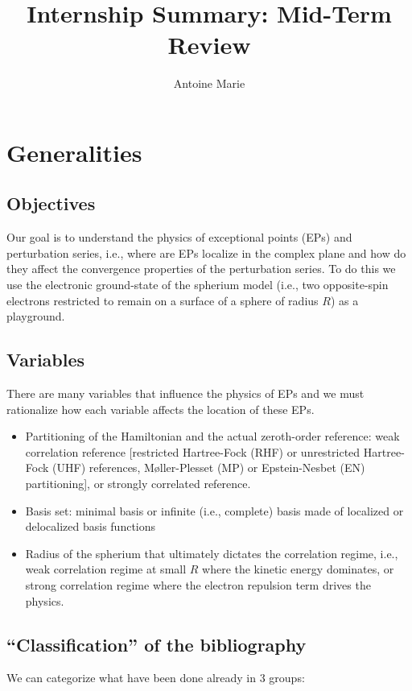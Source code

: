 \documentclass{article}
\title{Internship Summary: Mid-Term Review}
\author{Antoine Marie}
\begin{document}
\maketitle

\section{Generalities}

\subsection{Objectives}
Our goal is to understand the physics of exceptional points (EPs) and perturbation series, i.e., where are EPs localize in the complex plane and how do they affect the convergence properties of the perturbation series. To do this we use the electronic ground-state of the spherium model (i.e., two opposite-spin electrons restricted to remain on a surface of a sphere of radius $R$) as a playground.

\subsection{Variables}

There are many variables that influence the physics of EPs and we must rationalize how each variable affects the location of these EPs.
\begin{itemize}
	\item Partitioning of the Hamiltonian and the actual zeroth-order reference: weak correlation reference [restricted Hartree-Fock (RHF) or unrestricted Hartree-Fock (UHF) references, M{\o}ller-Plesset (MP) or Epstein-Nesbet (EN) partitioning], or strongly correlated reference.
	\item Basis set: minimal basis or infinite (i.e., complete) basis made of localized or delocalized basis functions
	\item Radius of the spherium that ultimately dictates the correlation regime, i.e., weak correlation regime at small $R$ where the kinetic energy dominates, or strong correlation regime where the electron repulsion term drives the physics.
\end{itemize}

\subsection{``Classification'' of the bibliography}

We can categorize what have been done already in 3 groups:
\end{document}
